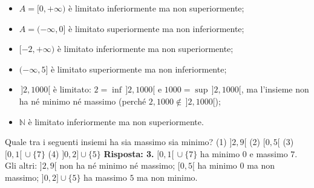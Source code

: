 \documentclass[11pt,a4paper]{article}
\begin{document}
\begin{esempio}
\leavevmode
\begin{itemize}
    \item $A = [0, +\infty)$ è limitato inferiormente ma non superiormente;
    \item $A = (-\infty, 0]$ è limitato superiormente ma non inferiormente;
    \item $[-2, +\infty)$ è limitato inferiormente ma non superiormente;
    \item $(-\infty, 5]$ è limitato superiormente ma non inferiormente;
    \item $\,]2, 1000[$ è limitato: $2 = \inf\,]2, 1000[$ e
          $1000 = \sup\,]2, 1000[$, ma l'insieme non ha né minimo né massimo
          (perché $2, 1000 \notin \,]2, 1000[$);
    \item $\mathbb{N}$ è limitato inferiormente ma non superiormente.
\end{itemize}
\end{esempio}

\begin{esercizio}
Quale tra i seguenti insiemi ha sia massimo sia minimo?
(1) $]2, 9[$ \qquad (2) $[0, 5[$ \qquad (3) $[0, 1[ \,\cup \{7\}$ \qquad (4) $]0, 2] \cup \{5\}$
\textbf{Risposta: 3.} $[0, 1[ \,\cup \{7\}$ ha minimo $0$ e massimo $7$. Gli altri: $]2, 9[$ non ha né minimo né massimo; $[0, 5[$ ha minimo $0$ ma non massimo; $]0, 2] \cup \{5\}$ ha massimo $5$ ma non minimo.
\end{esercizio}
\end{document}
